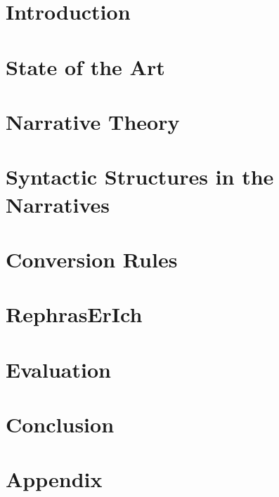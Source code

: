 \documentclass[digital, oneside, table, nolot, nolof]{fithesis4}
\begin{document}

\chapter{Introduction} \label{chap:uvod}


\chapter{State of the Art} \label{chap:state-of-art}


\chapter{Narrative Theory} \label{chap:teorie-vypraveni}


\chapter{Syntactic Structures in the Narratives} \label{chap:syntax}


\chapter{Conversion Rules} \label{chap:navrh-pravidel}


\chapter{RephrasErIch} \label{chap:rerich}


\chapter{Evaluation} \label{chap:evaluace}


\chapter{Conclusion} \label{chap:zaver}


\printbibliography

\appendix
\chapter{Appendix} \label{chap:appendix}

\end{document}
